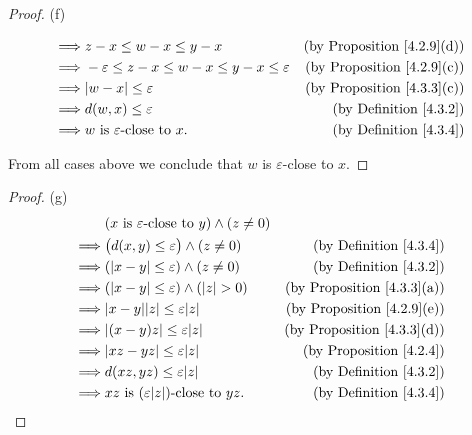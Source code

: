 \begin{proof}{(f)}
\begin{enumerate}[label=(\Roman*)]
\begin{align*}
                  \implies & z - x \leq w - x \leq y - x                                    & \text{(by Proposition \ref{4.2.9}(d))} \\
                  \implies & -\varepsilon \leq z - x \leq w - x \leq y - x \leq \varepsilon & \text{(by Proposition \ref{4.2.9}(c))} \\
                  \implies & \abs*{w - x} \leq \varepsilon                                  & \text{(by Proposition \ref{4.3.3}(c))} \\
                  \implies & d(w, x) \leq \varepsilon                                       & \text{(by Definition \ref{4.3.2})}     \\
                  \implies & w \text{ is } \varepsilon\text{-close to } x.                  & \text{(by Definition \ref{4.3.4})}
              \end{align*}
    \end{enumerate}
    From all cases above we conclude that \(w\) is \(\varepsilon\)-close to \(x\).
\end{proof}

\begin{proof}{(g)}
    \begin{align*}
                 & (x \text{ is } \varepsilon\text{-close to } y) \land (z \neq 0)                                          \\
        \implies & \big(d(x, y) \leq \varepsilon\big) \land (z \neq 0)             & \text{(by Definition \ref{4.3.4})}     \\
        \implies & (\abs*{x - y} \leq \varepsilon) \land (z \neq 0)                & \text{(by Definition \ref{4.3.2})}     \\
        \implies & (\abs*{x - y} \leq \varepsilon) \land (\abs*{z} > 0)            & \text{(by Proposition \ref{4.3.3}(a))} \\
        \implies & \abs*{x - y} \abs*{z} \leq \varepsilon \abs*{z}                 & \text{(by Proposition \ref{4.2.9}(e))} \\
        \implies & \abs*{(x - y)z} \leq \varepsilon \abs*{z}                       & \text{(by Proposition \ref{4.3.3}(d))} \\
        \implies & \abs*{xz - yz} \leq \varepsilon \abs*{z}                        & \text{(by Proposition \ref{4.2.4})}    \\
        \implies & d(xz, yz) \leq \varepsilon \abs*{z}                             & \text{(by Definition \ref{4.3.2})}     \\
        \implies & xz \text{ is } (\varepsilon \abs*{z})\text{-close to } yz.      & \text{(by Definition \ref{4.3.4})}
    \end{align*}
\end{proof}

